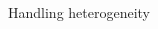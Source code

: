 \begin{frame}{Handling heterogeneity}
\begin{columns}
\begin{column}{.6\textwidth}
\begin{table}
\begin{tabularx}{.7\textwidth}{lX|ccc}
          
    \end{tabularx}
  \end{table}
  
         \end{column}
  \end{columns}
\end{frame}







                  
